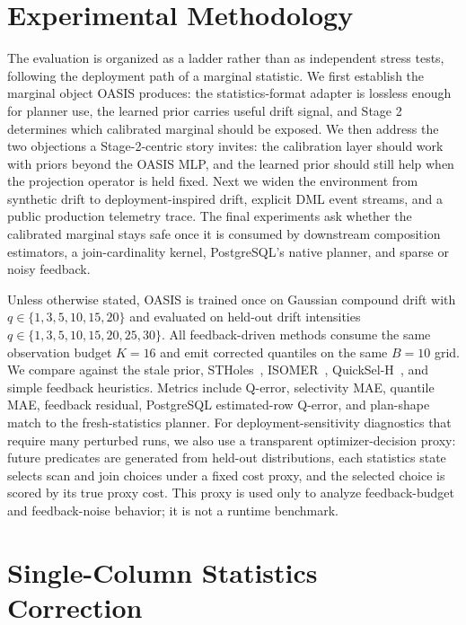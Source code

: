 \documentclass[preprint,12pt]{elsarticle}
\begin{document}
\section{Experimental Methodology}
\label{sec:experiments}

The evaluation is organized as a ladder rather than as independent stress tests,
following the deployment path of a marginal statistic. We first establish the
marginal object OASIS produces: the statistics-format adapter is lossless enough
for planner use, the learned prior carries useful drift signal, and Stage 2
determines which calibrated marginal should be exposed. We then address the two
objections a Stage-2-centric story invites: the calibration layer should work
with priors beyond the OASIS MLP, and the learned prior should still help when
the projection operator is held fixed. Next we widen the environment from
synthetic drift to deployment-inspired drift, explicit DML event streams, and a
public production telemetry trace. The final experiments ask whether the
calibrated marginal stays safe once it is consumed by downstream composition
estimators, a join-cardinality kernel, PostgreSQL's native planner, and sparse or
noisy feedback.

Unless otherwise stated, OASIS is trained once on Gaussian compound drift with
$q\in\{1,3,5,10,15,20\}$ and evaluated on held-out drift intensities
$q\in\{1,3,5,10,15,20,25,30\}$. All feedback-driven methods consume the same
observation budget $K=16$ and emit corrected quantiles on the same $B=10$ grid.
We compare against the stale prior, STHoles~\cite{bruno2001stholes},
ISOMER~\cite{markl2007consistent}, QuickSel-H~\cite{park2020quicksel}, and
simple feedback heuristics. Metrics include Q-error, selectivity MAE, quantile
MAE, feedback residual, PostgreSQL estimated-row Q-error, and plan-shape match
to the fresh-statistics planner. For deployment-sensitivity diagnostics that
require many perturbed runs, we also use a transparent optimizer-decision proxy:
future predicates are generated from held-out distributions, each statistics
state selects scan and join choices under a fixed cost proxy, and the selected
choice is scored by its true proxy cost. This proxy is used only to analyze
feedback-budget and feedback-noise behavior; it is not a runtime benchmark.

\section{Single-Column Statistics Correction}
\label{sec:single-column-results}
\end{document}
